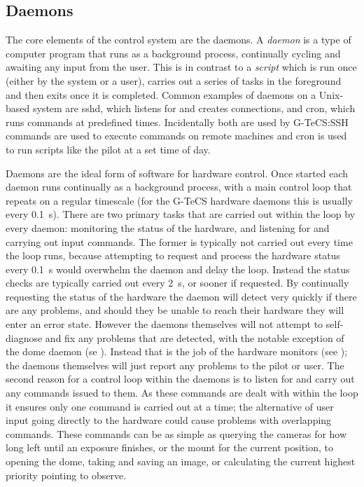 \begin{colsection}
\begin{colsection}
\end{colsection}


\subsection{Daemons}
\label{sec:daemons}
\begin{colsection}

The core elements of the control system are the daemons. A \emph{daemon} is a type of computer program that runs as a background process, continually cycling and awaiting any input from the user. This is in contrast to a \emph{script} which is run once (either by the system or a user), carries out a series of tasks in the foreground and then exits once it is completed. Common examples of daemons on a Unix-based system are sshd, which listens for and creates  connections, and cron, which runs commands at predefined times. Incidentally both are used by G-TeCS:\@ SSH commands are used to execute commands on remote machines and cron is used to run scripts like the pilot at a set time of day.

Daemons are the ideal form of software for hardware control. Once started each daemon runs continually as a background process, with a main control loop that repeats on a regular timescale (for the G-TeCS hardware daemons this is usually every \SI{0.1}{\second}). There are two primary tasks that are carried out within the loop by every daemon: monitoring the status of the hardware, and listening for and carrying out input commands. The former is typically not carried out every time the loop runs, because attempting to request and process the hardware status every \SI{0.1}{\second} would overwhelm the daemon and delay the loop. Instead the status checks are typically carried out every \SI{2}{\second}, or sooner if requested. By continually requesting the status of the hardware the daemon will detect very quickly if there are any problems, and should they be unable to reach their hardware they will enter an error state. However the daemons themselves will not attempt to self-diagnose and fix any problems that are detected, with the notable exception of the dome daemon (se ). Instead that is the job of the hardware monitors (see ); the daemons themselves will just report any problems to the pilot or user. The second reason for a control loop within the daemons is to listen for and carry out any commands issued to them. As these commands are dealt with within the loop it ensures only one command is carried out at a time; the alternative of user input going directly to the hardware could cause problems with overlapping commands. These commands can be as simple as querying the cameras for how long left until an exposure finishes, or the mount for the current position, to opening the dome, taking and saving an image, or calculating the current highest priority pointing to observe.


\end{colsection}
\end{colsection}
